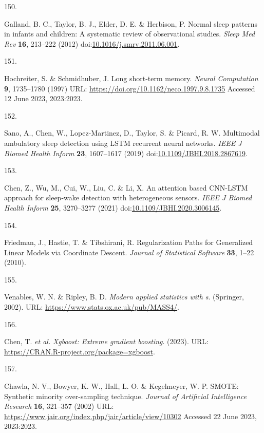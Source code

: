 \documentclass[
  10pt,
]{scrbook}
\newlength{\cslhangindent}
\newlength{\csllabelwidth}
\newlength{\cslentryspacingunit} %
\newenvironment{CSLReferences}[2] %
 {%
  \setlength{\parindent}{0pt}
  \ifodd #1
  \let\oldpar\par
  \def\par{\hangindent=\cslhangindent\oldpar}
  \fi
  \setlength{\parskip}{#2\cslentryspacingunit}
 }%
 {}
\newcommand{\CSLLeftMargin}[1]{\parbox[t]{\csllabelwidth}{#1}}
\newcommand{\CSLRightInline}[1]{\parbox[t]{\linewidth - \csllabelwidth}{#1}\break}
\let\originaltextbf\textbf
\renewcommand{\textbf}[1]{\textcolor{color1}{\textsf{\originaltextbf{#1}}}}
\begin{document}
\begin{CSLReferences}{0}{0}
\leavevmode{}%
\CSLLeftMargin{150. }%
\CSLRightInline{Galland, B. C., Taylor, B. J., Elder, D. E. \& Herbison,
P. Normal sleep patterns in infants and children: A systematic review of
observational studies. \emph{Sleep Med Rev} \textbf{16}, 213--222 (2012)
doi:\href{https://doi.org/10.1016/j.smrv.2011.06.001}{10.1016/j.smrv.2011.06.001}.}

\leavevmode{}%
\CSLLeftMargin{151. }%
\CSLRightInline{Hochreiter, S. \& Schmidhuber, J. Long short-term
memory. \emph{Neural Computation} \textbf{9}, 1735--1780 (1997) URL:
\url{https://doi.org/10.1162/neco.1997.9.8.1735} Accessed 12 June 2023,
2023:2023.}

\leavevmode{}%
\CSLLeftMargin{152. }%
\CSLRightInline{Sano, A., Chen, W., Lopez-Martinez, D., Taylor, S. \&
Picard, R. W. Multimodal ambulatory sleep detection using {LSTM}
recurrent neural networks. \emph{{IEEE} J Biomed Health Inform}
\textbf{23}, 1607--1617 (2019)
doi:\href{https://doi.org/10.1109/JBHI.2018.2867619}{10.1109/JBHI.2018.2867619}.}

\leavevmode{}%
\CSLLeftMargin{153. }%
\CSLRightInline{Chen, Z., Wu, M., Cui, W., Liu, C. \& Li, X. An
attention based {CNN}-{LSTM} approach for sleep-wake detection with
heterogeneous sensors. \emph{{IEEE} J Biomed Health Inform} \textbf{25},
3270--3277 (2021)
doi:\href{https://doi.org/10.1109/JBHI.2020.3006145}{10.1109/JBHI.2020.3006145}.}

\leavevmode{}%
\CSLLeftMargin{154. }%
\CSLRightInline{Friedman, J., Hastie, T. \& Tibshirani, R.
Regularization Paths for Generalized Linear Models via Coordinate
Descent. \emph{Journal of Statistical Software} \textbf{33}, 1--22
(2010).}

\leavevmode{}%
\CSLLeftMargin{155. }%
\CSLRightInline{Venables, W. N. \& Ripley, B. D. \emph{Modern applied
statistics with s}. (Springer, 2002). URL:
\url{https://www.stats.ox.ac.uk/pub/MASS4/}.}

\leavevmode{}%
\CSLLeftMargin{156. }%
\CSLRightInline{Chen, T. \emph{et al.} \emph{Xgboost: Extreme gradient
boosting}. (2023). URL:
\url{https://CRAN.R-project.org/package=xgboost}.}

\leavevmode{}%
\CSLLeftMargin{157. }%
\CSLRightInline{Chawla, N. V., Bowyer, K. W., Hall, L. O. \& Kegelmeyer,
W. P. {SMOTE}: Synthetic minority over-sampling technique. \emph{Journal
of Artificial Intelligence Research} \textbf{16}, 321--357 (2002) URL:
\url{https://www.jair.org/index.php/jair/article/view/10302} Accessed 22
June 2023, 2023:2023.}


\end{CSLReferences}
\end{document}
